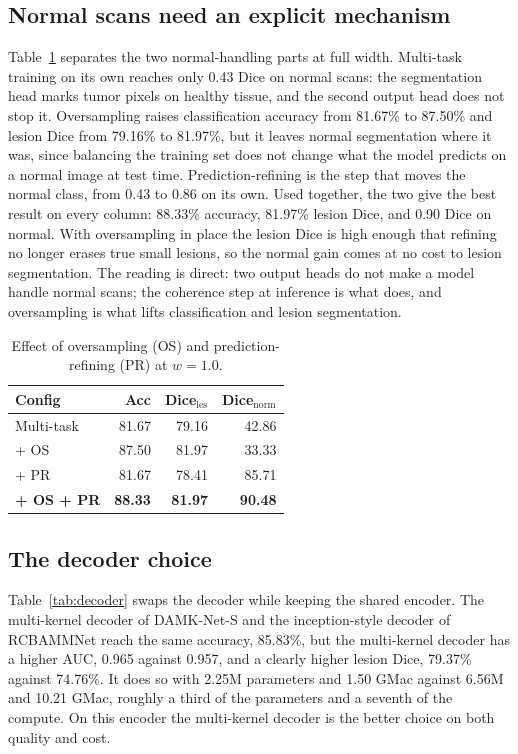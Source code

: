 \documentclass[runningheads]{llncs}
\begin{document}
\subsection{Normal scans need an explicit mechanism}
Table~\ref{tab:ablation} separates the two normal-handling parts at full width.
Multi-task training on its own reaches only 0.43 Dice on normal scans: the
segmentation head marks tumor pixels on healthy tissue, and the second output
head does not stop it. Oversampling raises classification accuracy from 81.67\% to
87.50\% and lesion Dice from 79.16\% to 81.97\%, but it leaves normal segmentation
where it was, since balancing the training set does not change what the model
predicts on a normal image at test time. Prediction-refining is the step that
moves the normal class, from 0.43 to 0.86 on its own. Used together, the two give
the best result on every column: 88.33\% accuracy, 81.97\% lesion Dice, and 0.90
Dice on normal. With oversampling in place the lesion Dice is high enough that
refining no longer erases true small lesions, so the normal gain comes at no cost
to lesion segmentation. The reading is direct: two output heads do not make a
model handle normal scans; the coherence step at inference is what does, and
oversampling is what lifts classification and lesion segmentation.

\begin{table}[t]
\caption{Effect of oversampling (OS) and prediction-refining (PR) at $w=1.0$.}
\label{tab:ablation}
\centering
\begin{tabular}{lrrr}
\toprule
Config & Acc & Dice$_{\text{les}}$ & Dice$_{\text{norm}}$ \\
\midrule
Multi-task       & 81.67 & 79.16 & 42.86 \\
\quad + OS       & 87.50 & 81.97 & 33.33 \\
\quad + PR       & 81.67 & 78.41 & 85.71 \\
\textbf{\quad + OS + PR} & \textbf{88.33} & \textbf{81.97} & \textbf{90.48} \\
\bottomrule
\end{tabular}
\end{table}

\subsection{The decoder choice}
Table~\ref{tab:decoder} swaps the decoder while keeping the shared encoder. The
multi-kernel decoder of DAMK-Net-S and the inception-style decoder of RCBAMMNet
reach the same accuracy, 85.83\%, but the multi-kernel decoder has a higher AUC,
0.965 against 0.957, and a clearly higher lesion Dice, 79.37\% against 74.76\%. It
does so with 2.25M parameters and 1.50 GMac against 6.56M and 10.21 GMac, roughly
a third of the parameters and a seventh of the compute. On this encoder the
multi-kernel decoder is the better choice on both quality and cost.
\end{document}

